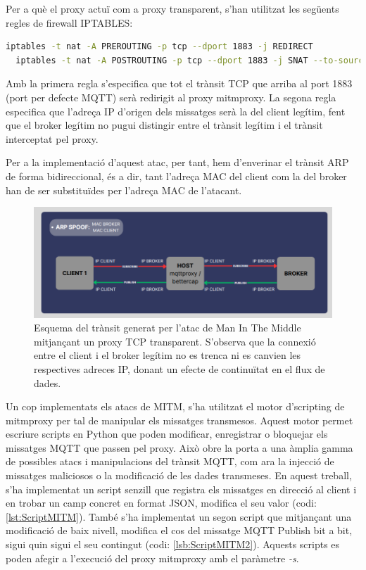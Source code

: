Per a què el proxy actuï com a proxy transparent, s'han utilitzat les següents regles de firewall IPTABLES:

\begin{lstlisting}[language=bash, caption={Execució iptables}, label=lst:iptables]
  iptables -t nat -A PREROUTING -p tcp --dport 1883 -j REDIRECT
  iptables -t nat -A POSTROUTING -p tcp --dport 1883 -j SNAT --to-source 192.168.0.41
  \end{lstlisting}

  Amb la primera regla s'especifica que tot el trànsit TCP que arriba al port 1883 (port per defecte MQTT) serà redirigit al proxy mitmproxy. La segona regla especifica que l'adreça IP d'origen dels missatges serà la del client legítim, fent que el broker legítim no pugui distingir entre el trànsit legítim i el trànsit interceptat pel proxy.

  Per a la implementació d'aquest atac, per tant, hem d'enverinar el trànsit ARP de forma bidireccional, és a dir, tant l'adreça MAC del client com la del broker han de ser substituïdes per l'adreça MAC de l'atacant.

  \begin{figure}[H]
    \centering
    \includegraphics[width=1\textwidth]{img/mitmproxytransp.png}
    \caption{Esquema del trànsit generat per l'atac de Man In The Middle mitjançant un proxy TCP transparent. S'observa que la connexió entre el client i el broker legítim no es trenca ni es canvien les respectives adreces IP, donant un efecte de continuïtat en el flux de dades.}
    \label{fig:MITMproxyTransparent}
  \end{figure}

  Un cop implementats els atacs de MITM, s'ha utilitzat el motor d'scripting de mitmproxy per tal de manipular els missatges transmesos. Aquest motor permet escriure scripts en Python que poden modificar, enregistrar o bloquejar els missatges MQTT que passen pel proxy. Això obre la porta a una àmplia gamma de possibles atacs i manipulacions del trànsit MQTT, com ara la injecció de missatges maliciosos o la modificació de les dades transmeses. En aquest treball, s'ha implementat un script senzill que registra els missatges en direcció al client i en trobar un camp concret en format JSON, modifica el seu valor (codi: \ref{lst:ScriptMITM}). També s'ha implementat un segon script que mitjançant una modificació de baix nivell, modifica el cos del missatge MQTT Publish bit a bit, sigui quin sigui el seu contingut (codi: \ref{lsb:ScriptMITM2}). Aquests scripts es poden afegir a l'execució del proxy mitmproxy amb el paràmetre \textit{-s}.

